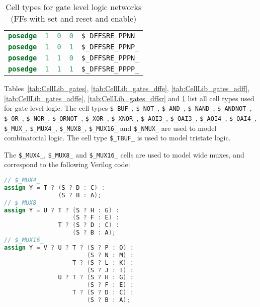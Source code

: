 \begin{table}[t]
\begin{tabular}[t]{lllll}
\lstinline[language=Verilog];posedge; & \lstinline[language=Verilog];1; & \lstinline[language=Verilog];0; & \lstinline[language=Verilog];0; & {\tt \$\_DFFSRE\_PPNN\_} \\
\lstinline[language=Verilog];posedge; & \lstinline[language=Verilog];1; & \lstinline[language=Verilog];0; & \lstinline[language=Verilog];1; & {\tt \$\_DFFSRE\_PPNP\_} \\
\lstinline[language=Verilog];posedge; & \lstinline[language=Verilog];1; & \lstinline[language=Verilog];1; & \lstinline[language=Verilog];0; & {\tt \$\_DFFSRE\_PPPN\_} \\
\lstinline[language=Verilog];posedge; & \lstinline[language=Verilog];1; & \lstinline[language=Verilog];1; & \lstinline[language=Verilog];1; & {\tt \$\_DFFSRE\_PPPP\_} \\
\end{tabular}
\caption{Cell types for gate level logic networks (FFs with set and reset and enable)}
\label{tab:CellLib_gates_dffsre}
\end{table}

Tables~\ref{tab:CellLib_gates}, \ref{tab:CellLib_gates_dffe}, \ref{tab:CellLib_gates_adff}, \ref{tab:CellLib_gates_adffe}, \ref{tab:CellLib_gates_dffsr} and \ref{tab:CellLib_gates_dffsre} list all cell types used for gate level logic. The cell types
{\tt \$\_BUF\_}, {\tt \$\_NOT\_}, {\tt \$\_AND\_}, {\tt \$\_NAND\_}, {\tt \$\_ANDNOT\_},
{\tt \$\_OR\_}, {\tt \$\_NOR\_}, {\tt \$\_ORNOT\_}, {\tt \$\_XOR\_}, {\tt \$\_XNOR\_},
{\tt \$\_AOI3\_}, {\tt \$\_OAI3\_}, {\tt \$\_AOI4\_}, {\tt \$\_OAI4\_},
{\tt \$\_MUX\_}, {\tt \$\_MUX4\_}, {\tt \$\_MUX8\_}, {\tt \$\_MUX16\_} and {\tt \$\_NMUX\_} are used to model combinatorial logic.
The cell type {\tt \$\_TBUF\_} is used to model tristate logic.

The {\tt \$\_MUX4\_}, {\tt \$\_MUX8\_} and {\tt \$\_MUX16\_} cells are used to model wide muxes, and correspond to the following Verilog code:

\begin{lstlisting}[language=Verilog]
// $_MUX4_
assign Y = T ? (S ? D : C) :
               (S ? B : A);
// $_MUX8_
assign Y = U ? T ? (S ? H : G) :
                   (S ? F : E) :
               T ? (S ? D : C) :
                   (S ? B : A);
// $_MUX16_
assign Y = V ? U ? T ? (S ? P : O) :
                       (S ? N : M) :
                   T ? (S ? L : K) :
                       (S ? J : I) :
               U ? T ? (S ? H : G) :
                       (S ? F : E) :
                   T ? (S ? D : C) :
                       (S ? B : A);
\end{lstlisting}

